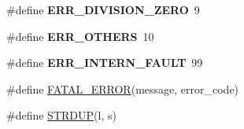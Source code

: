 \begin{DoxyCompactItemize}
\item 
\#define {\bfseries E\+R\+R\+\_\+\+D\+I\+V\+I\+S\+I\+O\+N\+\_\+\+Z\+E\+RO}~9\hypertarget{group__expression__processing_ga7226d4889da856a935d6749b45778022}{}\label{group__expression__processing_ga7226d4889da856a935d6749b45778022}

\item 
\#define {\bfseries E\+R\+R\+\_\+\+O\+T\+H\+E\+RS}~10\hypertarget{group__expression__processing_ga18dd2f4dc443436ec22915d1a2ff1667}{}\label{group__expression__processing_ga18dd2f4dc443436ec22915d1a2ff1667}

\item 
\#define {\bfseries E\+R\+R\+\_\+\+I\+N\+T\+E\+R\+N\+\_\+\+F\+A\+U\+LT}~99\hypertarget{group__expression__processing_ga81c0b2aff83c4ff667ff4fe7bb17fe26}{}\label{group__expression__processing_ga81c0b2aff83c4ff667ff4fe7bb17fe26}

\item 
\#define \hyperlink{group__expression__processing_gad00ce6a1d92b76fec757cc05ca401c20}{F\+A\+T\+A\+L\+\_\+\+E\+R\+R\+OR}(message,  error\+\_\+code)
\item 
\#define \hyperlink{group__expression__processing_gaefbe6596bcbb11c624652e80c37ec88a}{S\+T\+R\+D\+UP}(l,  s)
\end{DoxyCompactItemize}

